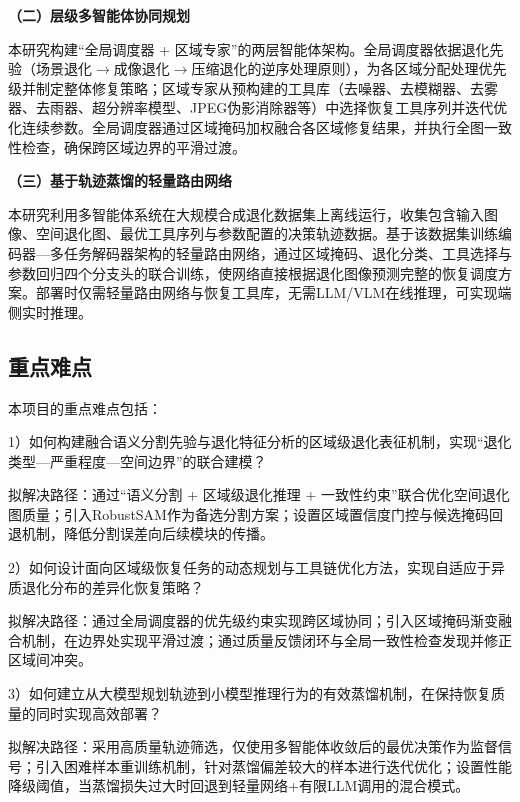 \textbf{（二）层级多智能体协同规划}

本研究构建“全局调度器 + 区域专家”的两层智能体架构。全局调度器依据退化先验（场景退化$\to$成像退化$\to$压缩退化的逆序处理原则），为各区域分配处理优先级并制定整体修复策略；区域专家从预构建的工具库（去噪器、去模糊器、去雾器、去雨器、超分辨率模型、JPEG伪影消除器等）中选择恢复工具序列并迭代优化连续参数。全局调度器通过区域掩码加权融合各区域修复结果，并执行全图一致性检查，确保跨区域边界的平滑过渡。

\textbf{（三）基于轨迹蒸馏的轻量路由网络}

本研究利用多智能体系统在大规模合成退化数据集上离线运行，收集包含输入图像、空间退化图、最优工具序列与参数配置的决策轨迹数据。基于该数据集训练编码器—多任务解码器架构的轻量路由网络，通过区域掩码、退化分类、工具选择与参数回归四个分支头的联合训练，使网络直接根据退化图像预测完整的恢复调度方案。部署时仅需轻量路由网络与恢复工具库，无需LLM/VLM在线推理，可实现端侧实时推理。

\subsection{重点难点}

本项目的重点难点包括：

1）如何构建融合语义分割先验与退化特征分析的区域级退化表征机制，实现“退化类型—严重程度—空间边界”的联合建模？

拟解决路径：通过“语义分割 + 区域级退化推理 + 一致性约束”联合优化空间退化图质量；引入RobustSAM作为备选分割方案；设置区域置信度门控与候选掩码回退机制，降低分割误差向后续模块的传播。

2）如何设计面向区域级恢复任务的动态规划与工具链优化方法，实现自适应于异质退化分布的差异化恢复策略？

拟解决路径：通过全局调度器的优先级约束实现跨区域协同；引入区域掩码渐变融合机制，在边界处实现平滑过渡；通过质量反馈闭环与全局一致性检查发现并修正区域间冲突。

3）如何建立从大模型规划轨迹到小模型推理行为的有效蒸馏机制，在保持恢复质量的同时实现高效部署？

拟解决路径：采用高质量轨迹筛选，仅使用多智能体收敛后的最优决策作为监督信号；引入困难样本重训练机制，针对蒸馏偏差较大的样本进行迭代优化；设置性能降级阈值，当蒸馏损失过大时回退到轻量网络+有限LLM调用的混合模式。

